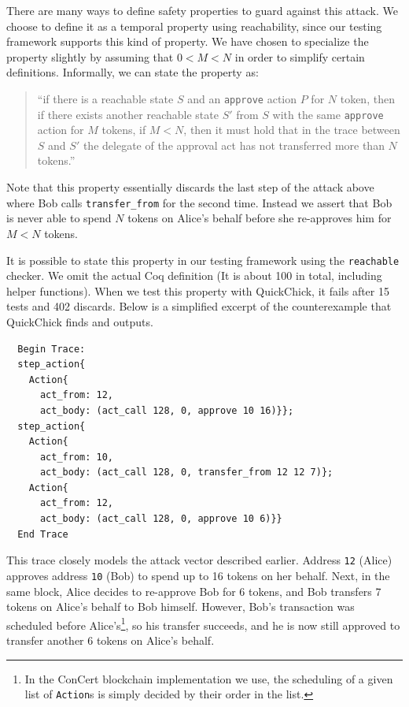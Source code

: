 \documentclass[twoside,11pt,openright]{report}
\newenvironment{code}{\captionsetup{type=figure, singlelinecheck=off, justification=raggedleft}}{}
\newcommand{\coq}[1]{\texttt{#1}}
\begin{document}
There are many ways to define safety properties to guard against this attack. We choose to define it as a temporal property using reachability, since our testing framework supports this kind of property. We have chosen to specialize the property slightly by assuming that $0 < M < N$ in order to simplify certain definitions. Informally, we can state the property as:

\begin{quote}
    ``if there is a reachable state $S$ and an \coq{approve} action $P$ for $N$ token, then if there exists another reachable state $S'$ from $S$ with the same \coq{approve} action for $M$ tokens, if $M < N$, then it must hold that in the trace between $S$ and $S'$ the delegate of the approval act has not transferred more than $N$ tokens.'' 
\end{quote}
Note that this property essentially discards the last step of the attack above where Bob calls \coq{transfer\_from} for the second time. Instead we assert that Bob is never able to spend $N$ tokens on Alice's behalf before she re-approves him for $M < N$ tokens. 

It is possible to state this property in our testing framework using the \coq{reachable} checker. We omit the actual Coq definition (It is about 100 in total, including helper functions). When we test this property with QuickChick, it fails after 15 tests and 402 discards. Below is a simplified excerpt of the counterexample that QuickChick finds and outputs.
\begin{code}
\begin{verbatim}
  Begin Trace: 
  step_action{
    Action{
      act_from: 12, 
      act_body: (act_call 128, 0, approve 10 16)}};
  step_action{
    Action{
      act_from: 10, 
      act_body: (act_call 128, 0, transfer_from 12 12 7)};
    Action{
      act_from: 12, 
      act_body: (act_call 128, 0, approve 10 6)}}
  End Trace
\end{verbatim}
\end{code}
This trace closely models the attack vector described earlier. Address \coq{12} (Alice) approves address \coq{10} (Bob) to spend up to 16 tokens on her behalf. Next, in the same block, Alice decides to re-approve Bob for 6 tokens, and Bob transfers 7 tokens on Alice's behalf to Bob himself. However, Bob's transaction was scheduled before Alice's\footnote{In the ConCert blockchain implementation we use, the scheduling of a given list of \coq{Action}s is simply decided by their order in the list.}, so his transfer succeeds, and he is now still approved to transfer another 6 tokens on Alice's behalf. 
\end{document}
